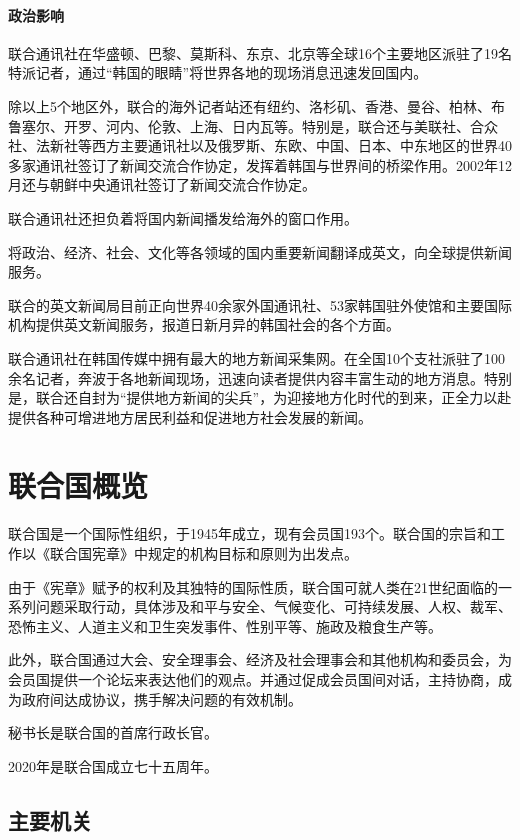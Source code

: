 \documentclass[a4paper,openany]{book}
\begin{document}
\subsubsection{政治影响}

联合通讯社在华盛顿、巴黎、莫斯科、东京、北京等全球16个主要地区派驻了19名特派记者，通过“韩国的眼睛”将世界各地的现场消息迅速发回国内。

除以上5个地区外，联合的海外记者站还有纽约、洛杉矶、香港、曼谷、柏林、布鲁塞尔、开罗、河内、伦敦、上海、日内瓦等。特别是，联合还与美联社、合众社、法新社等西方主要通讯社以及俄罗斯、东欧、中国、日本、中东地区的世界40多家通讯社签订了新闻交流合作协定，发挥着韩国与世界间的桥梁作用。2002年12月还与朝鲜中央通讯社签订了新闻交流合作协定。

联合通讯社还担负着将国内新闻播发给海外的窗口作用。

将政治、经济、社会、文化等各领域的国内重要新闻翻译成英文，向全球提供新闻服务。

联合的英文新闻局目前正向世界40余家外国通讯社、53家韩国驻外使馆和主要国际机构提供英文新闻服务，报道日新月异的韩国社会的各个方面。

联合通讯社在韩国传媒中拥有最大的地方新闻采集网。在全国10个支社派驻了100余名记者，奔波于各地新闻现场，迅速向读者提供内容丰富生动的地方消息。特别是，联合还自封为“提供地方新闻的尖兵”，为迎接地方化时代的到来，正全力以赴提供各种可增进地方居民利益和促进地方社会发展的新闻。

\newpage

\appendix


\chapter{联合国概览}

联合国是一个国际性组织，于1945年成立，现有会员国193个。联合国的宗旨和工作以《联合国宪章》中规定的机构目标和原则为出发点。

由于《宪章》赋予的权利及其独特的国际性质，联合国可就人类在21世纪面临的一系列问题采取行动，具体涉及和平与安全、气候变化、可持续发展、人权、裁军、恐怖主义、人道主义和卫生突发事件、性别平等、施政及粮食生产等。

此外，联合国通过大会、安全理事会、经济及社会理事会和其他机构和委员会，为会员国提供一个论坛来表达他们的观点。并通过促成会员国间对话，主持协商，成为政府间达成协议，携手解决问题的有效机制。

秘书长是联合国的首席行政长官。

2020年是联合国成立七十五周年。

\section{主要机关}
\end{document}
